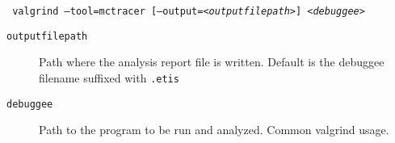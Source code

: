 \texttt{
	valgrind --tool=mctracer
	[--output=<\textit{outputfilepath}>]
	<\textit{debuggee}>
}
\begin{description}
\item[\texttt{outputfilepath}] Path where the analysis report file is written. Default is the debuggee filename suffixed with \texttt{.etis}
\item[\texttt{debuggee}] Path to the program to be run and analyzed. Common valgrind usage.
\end{description}
